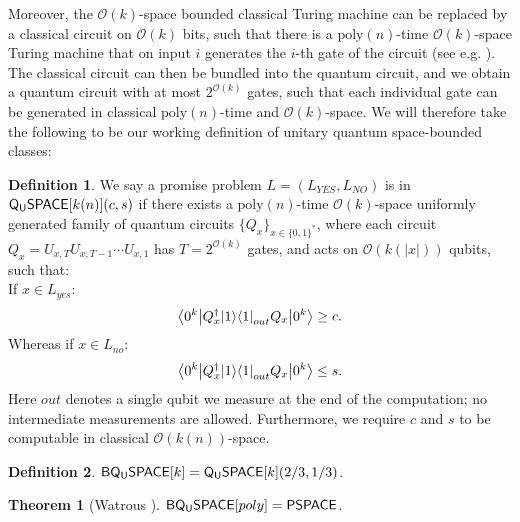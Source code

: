 \documentclass[11pt]{article}
\newtheorem{theorem}{Theorem}
\theoremstyle{definition}
\theoremstyle{remark}
\theoremstyle{definition}
\newtheorem{definition}{Definition}
\newcommand\QSPACE{{\sf{Q_{U}SPACE}}}
\newcommand\PQSPACE{{\sf{PQ_{U}SPACE}}}
\newcommand\BQSPACE{{\sf{BQ_{U}SPACE}}}
\newcommand\PSPACE{{\sf{PSPACE}}}
\newcommand\bigoh{\mathcal{O}}
\newcommand{\poly}{\textrm{poly}}
\begin{document}
Moreover, the $\mathcal{O}(k)$-space bounded classical Turing machine can be replaced by a classical circuit on $\mathcal{O}(k)$ bits, such that there is a $\poly(n)$-time $\mathcal{O}(k)$-space Turing machine that on input $i$ generates the $i$-th gate of the circuit (see e.g. \cite[Section~6.8]{ab09}). The classical circuit can then be bundled into the quantum circuit, and we obtain a quantum circuit with at most $2^{\mathcal{O}(k)}$ gates, such that each individual gate can be generated in classical $\poly(n)$-time and $\mathcal{O}(k)$-space. We will therefore take the following to be our working definition of unitary quantum space-bounded classes:

\begin{definition}
We say a promise problem $L=(L_{YES},L_{NO})$ is in $\QSPACE[k(n)](c,s)$ if there exists a $\poly(n)$-time $\mathcal{O}(k)$-space uniformly generated family of quantum circuits $\{Q_x\}_{x\in\{0,1\}^*}$, where each circuit $Q_x=U_{x,T}U_{x,T-1}\cdots U_{x,1}$ has $T=2^{\mathcal{O}(k)}$ gates, and acts on $\mathcal{O}(k(|x|))$ qubits, such that:\\
 If $x \in L_{yes}$:
\begin{equation}
{\left\langle{0^k}\right\vert} Q^\dagger_x {\left\vert{1}\right\rangle}{\left\langle{1}\right\vert}_{out} Q_x {\left\vert{0^k}\right\rangle} \ge c.
\end{equation}
Whereas if $x \in L_{no}$:
\begin{equation}
{\left\langle{0^k}\right\vert} Q^\dagger_x {\left\vert{1}\right\rangle}{\left\langle{1}\right\vert}_{out} Q_x {\left\vert{0^k}\right\rangle} \le s.
\end{equation}
Here $out$ denotes a single qubit we measure at the end of the computation; no intermediate measurements are allowed.  
Furthermore, we require $c$ and $s$ to be computable in classical $\bigoh(k(n))$-space.
\end{definition}

\begin{definition} $\BQSPACE[k]=\QSPACE[k](2/3,1/3)$.\end{definition}
\begin{theorem}[Watrous \cite{Watrous99}]\label{thm:pqpspace} $\BQSPACE[poly]=\PSPACE$.
\end{theorem}
\end{document}
